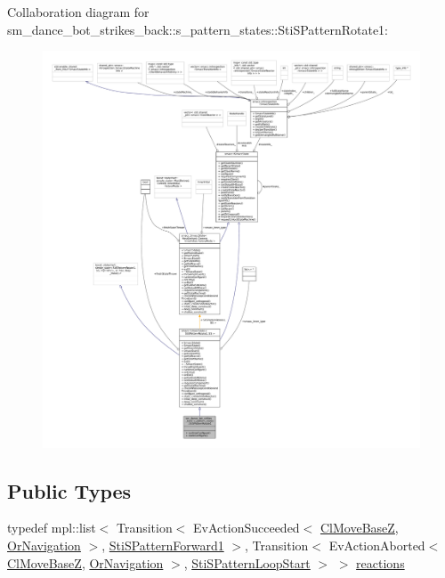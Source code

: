 Collaboration diagram for sm\+\_\+dance\+\_\+bot\+\_\+strikes\+\_\+back\+:\+:s\+\_\+pattern\+\_\+states\+:\+:Sti\+S\+Pattern\+Rotate1\+:
\nopagebreak
\begin{figure}[H]
\begin{center}
\leavevmode
\includegraphics[width=350pt]{structsm__dance__bot__strikes__back_1_1s__pattern__states_1_1StiSPatternRotate1__coll__graph}
\end{center}
\end{figure}
\subsection*{Public Types}
\begin{DoxyCompactItemize}
\item 
typedef mpl\+::list$<$ Transition$<$ Ev\+Action\+Succeeded$<$ \hyperlink{classmove__base__z__client_1_1ClMoveBaseZ}{Cl\+Move\+BaseZ}, \hyperlink{classsm__dance__bot__strikes__back_1_1OrNavigation}{Or\+Navigation} $>$, \hyperlink{structsm__dance__bot__strikes__back_1_1s__pattern__states_1_1StiSPatternForward1}{Sti\+S\+Pattern\+Forward1} $>$, Transition$<$ Ev\+Action\+Aborted$<$ \hyperlink{classmove__base__z__client_1_1ClMoveBaseZ}{Cl\+Move\+BaseZ}, \hyperlink{classsm__dance__bot__strikes__back_1_1OrNavigation}{Or\+Navigation} $>$, \hyperlink{structsm__dance__bot__strikes__back_1_1s__pattern__states_1_1StiSPatternLoopStart}{Sti\+S\+Pattern\+Loop\+Start} $>$ $>$ \hyperlink{structsm__dance__bot__strikes__back_1_1s__pattern__states_1_1StiSPatternRotate1_a86dfb53e8686c92849d48dd8679bd32a}{reactions}
\end{DoxyCompactItemize}
